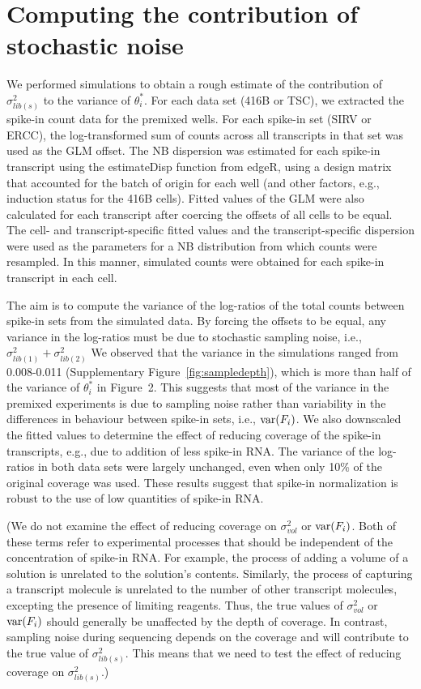 \documentclass{article}
\newcommand{\figvarestimates}{2}
\begin{document}
\section{Computing the contribution of stochastic noise}
We performed simulations to obtain a rough estimate of the contribution of $\sigma^2_{lib(s)}$ to the variance of $\theta^*_i$.
For each data set (416B or TSC), we extracted the spike-in count data for the premixed wells.
For each spike-in set (SIRV or ERCC), the log-transformed sum of counts across all transcripts in that set was used as the GLM offset. 
The NB dispersion was estimated for each spike-in transcript using the estimateDisp function from edgeR, using a design matrix that accounted for the batch of origin for each well (and other factors, e.g., induction status for the 416B cells).
Fitted values of the GLM were also calculated for each transcript after coercing the offsets of all cells to be equal.
The cell- and transcript-specific fitted values and the transcript-specific dispersion were used as the parameters for a NB distribution from which counts were resampled.
In this manner, simulated counts were obtained for each spike-in transcript in each cell.

The aim is to compute the variance of the log-ratios of the total counts between spike-in sets from the simulated data.
By forcing the offsets to be equal, any variance in the log-ratios must be due to stochastic sampling noise, i.e.,  $\sigma^2_{lib(1)} + \sigma^2_{lib(2)}$
We observed that the variance in the simulations ranged from 0.008-0.011 (Supplementary Figure~\ref{fig:sampledepth}), which is more than half of the variance of $\theta^*_i$ in Figure~\figvarestimates{}.
This suggests that most of the variance in the premixed experiments is due to sampling noise rather than variability in the differences in behaviour between spike-in sets, i.e., $\mbox{var}(F_i)$.
We also downscaled the fitted values to determine the effect of reducing coverage of the spike-in transcripts, e.g., due to addition of less spike-in RNA.
The variance of the log-ratios in both data sets were largely unchanged, even when only 10\% of the original coverage was used.
These results suggest that spike-in normalization is robust to the use of low quantities of spike-in RNA.

(We do not examine the effect of reducing coverage on $\sigma^2_{vol}$ or $\mbox{var}(F_i)$.
Both of these terms refer to experimental processes that should be independent of the concentration of spike-in RNA.
For example, the process of adding a volume of a solution is unrelated to the solution's contents.
Similarly, the process of capturing a transcript molecule is unrelated to the number of other transcript molecules, excepting the presence of limiting reagents.
Thus, the true values of $\sigma^2_{vol}$ or $\mbox{var}(F_i)$ should generally be unaffected by the depth of coverage.
In contrast, sampling noise during sequencing depends on the coverage and will contribute to the true value of $\sigma^2_{lib(s)}$.
This means that we need to test the effect of reducing coverage on $\sigma^2_{lib(s)}$.)
\end{document}
